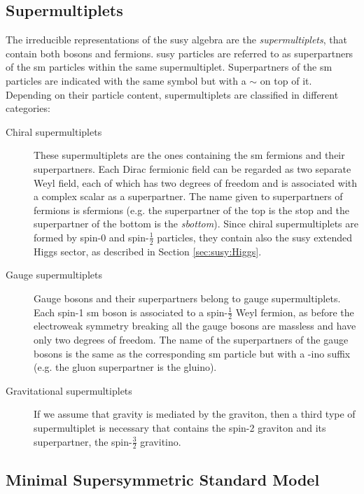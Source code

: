 \subsection{Supermultiplets}

The irreducible representations of the \gls{susy} algebra are the \textit{supermultiplets}, that contain both bosons and fermions. 
\gls{susy} particles are referred to as superpartners of the \gls{sm} particles within the same supermultiplet.
Superpartners of the \gls{sm} particles are indicated with the same symbol but with a $\sim$ on top of it. Depending on their particle content, supermultiplets are classified in different categories:

\begin{description}
\item[Chiral supermultiplets] These supermultiplets are the ones containing the \gls{sm} fermions and their superpartners. Each Dirac fermionic field can be regarded as two separate Weyl field, each of which has two degrees of freedom and is associated with a complex scalar as a superpartner. The name given to superpartners of fermions is sfermions (e.g. the superpartner of the top is the stop and the superpartner of the bottom is the \textit{sbottom}). Since chiral supermultiplets are formed by spin-0 and spin-$\frac{1}{2}$ particles, they contain also the \gls{susy} extended Higgs sector, as described in Section \ref{sec:susy:Higgs}.

\item[Gauge supermultiplets] Gauge bosons and their superpartners belong to gauge supermultiplets. Each spin-1 \gls{sm} boson is associated to a spin-$\frac{1}{2}$ Weyl fermion, as before the electroweak symmetry breaking all the gauge bosons are massless and have only two degrees of freedom. The name of the superpartners of the gauge bosons is the same as the corresponding \gls{sm} particle but with a -ino suffix (e.g. the gluon superpartner is the gluino). 

\item[Gravitational supermultiplets] If we assume that gravity is mediated by the graviton, then a third type of supermultiplet is necessary that contains the spin-2 graviton and its superpartner, the spin-$\frac{3}{2}$ gravitino.

\end{description}




\subsection{Minimal Supersymmetric Standard Model}

